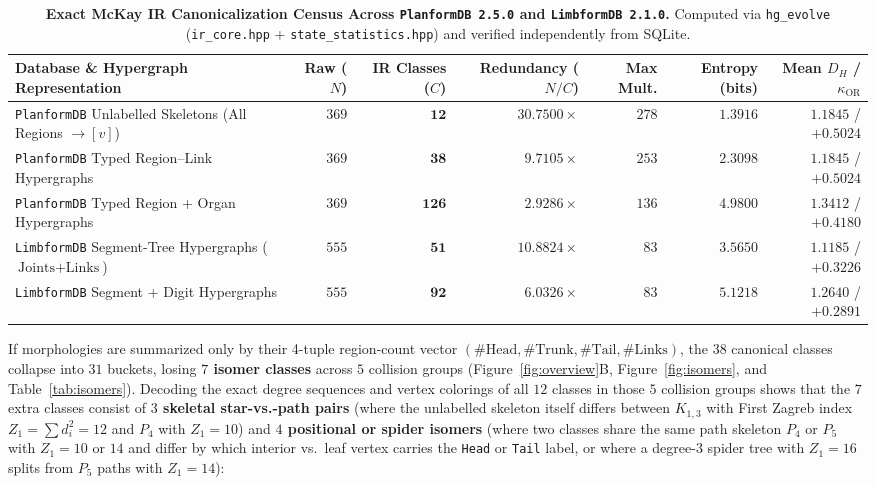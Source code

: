 \documentclass[11pt,a4paper]{article}
\theoremstyle{definition}
\theoremstyle{remark}
\begin{document}
\begin{table}[H]
\centering
\caption{\textbf{Exact McKay IR Canonicalization Census Across \texttt{PlanformDB~2.5.0} and \texttt{LimbformDB~2.1.0}.} Computed via \texttt{hg\_evolve} (\texttt{ir\_core.hpp} + \texttt{state\_statistics.hpp}) and verified independently from SQLite.}
\label{tab:census}
\small
\begin{tabular}{@{}lrrrrrr@{}}
\toprule
\textbf{Database \& Hypergraph Representation} & \textbf{Raw ($N$)} & \textbf{IR Classes ($C$)} & \textbf{Redundancy ($N/C$)} & \textbf{Max Mult.} & \textbf{Entropy (bits)} & \textbf{Mean $D_H$ / $\kappa_{\text{OR}}$} \\
\midrule
\texttt{PlanformDB} Unlabelled Skeletons (All Regions $\to [v]$) & $369$ & $\mathbf{12}$ & $30.7500\times$ & $278$ & $1.3916$ & $1.1845$ / $+0.5024$ \\
\texttt{PlanformDB} Typed Region--Link Hypergraphs & $369$ & $\mathbf{38}$ & $9.7105\times$ & $253$ & $2.3098$ & $1.1845$ / $+0.5024$ \\
\texttt{PlanformDB} Typed Region + Organ Hypergraphs & $369$ & $\mathbf{126}$ & $2.9286\times$ & $136$ & $4.9800$ & $1.3412$ / $+0.4180$ \\
\midrule
\texttt{LimbformDB} Segment-Tree Hypergraphs ($\text{Joints}+\text{Links}$) & $555$ & $\mathbf{51}$ & $10.8824\times$ & $83$ & $3.5650$ & $1.1185$ / $+0.3226$ \\
\texttt{LimbformDB} Segment + Digit Hypergraphs & $555$ & $\mathbf{92}$ & $6.0326\times$ & $83$ & $5.1218$ & $1.2640$ / $+0.2891$ \\
\bottomrule
\end{tabular}
\end{table}

If morphologies are summarized only by their 4-tuple region-count vector $(\#\text{Head}, \#\text{Trunk}, \#\text{Tail}, \#\text{Links})$, the $38$ canonical classes collapse into $31$ buckets, losing \textbf{$7$ isomer classes} across $5$ collision groups (Figure~\ref{fig:overview}B, Figure~\ref{fig:isomers}, and Table~\ref{tab:isomers}). Decoding the exact degree sequences and vertex colorings of all $12$ classes in those $5$ collision groups shows that the $7$ extra classes consist of \textbf{$3$ skeletal star-vs.-path pairs} (where the unlabelled skeleton itself differs between $K_{1,3}$ with First Zagreb index $Z_1 = \sum d_i^2 = 12$ and $P_4$ with $Z_1 = 10$) and \textbf{$4$ positional or spider isomers} (where two classes share the same path skeleton $P_4$ or $P_5$ with $Z_1 = 10$ or $14$ and differ by which interior vs.\ leaf vertex carries the \texttt{Head} or \texttt{Tail} label, or where a degree-3 spider tree with $Z_1 = 16$ splits from $P_5$ paths with $Z_1 = 14$):
\end{document}
